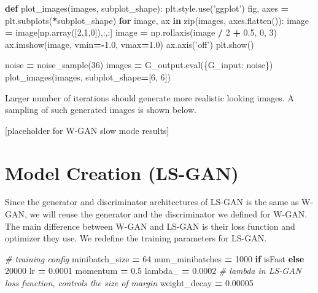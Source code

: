 \documentclass[]{book}
\newenvironment{Shaded}{\begin{snugshade}}{\end{snugshade}}
\newcommand{\KeywordTok}[1]{\textcolor[rgb]{0.13,0.29,0.53}{\textbf{#1}}}
\newcommand{\DecValTok}[1]{\textcolor[rgb]{0.00,0.00,0.81}{#1}}
\newcommand{\FloatTok}[1]{\textcolor[rgb]{0.00,0.00,0.81}{#1}}
\newcommand{\StringTok}[1]{\textcolor[rgb]{0.31,0.60,0.02}{#1}}
\newcommand{\CommentTok}[1]{\textcolor[rgb]{0.56,0.35,0.01}{\textit{#1}}}
\newcommand{\ControlFlowTok}[1]{\textcolor[rgb]{0.13,0.29,0.53}{\textbf{#1}}}
\newcommand{\OperatorTok}[1]{\textcolor[rgb]{0.81,0.36,0.00}{\textbf{#1}}}
\newcommand{\BuiltInTok}[1]{#1}
\newcommand{\NormalTok}[1]{#1}
\theoremstyle{definition}
\theoremstyle{definition}
\theoremstyle{definition}
\theoremstyle{remark}
\begin{document}
\begin{Shaded}
\begin{Highlighting}[]
\KeywordTok{def}\NormalTok{ plot_images(images, subplot_shape):}
\NormalTok{    plt.style.use(}\StringTok{'ggplot'}\NormalTok{)}
\NormalTok{    fig, axes }\OperatorTok{=}\NormalTok{ plt.subplots(}\OperatorTok{*}\NormalTok{subplot_shape)}
    \ControlFlowTok{for}\NormalTok{ image, ax }\KeywordTok{in} \BuiltInTok{zip}\NormalTok{(images, axes.flatten()):}
\NormalTok{        image }\OperatorTok{=}\NormalTok{ image[np.array([}\DecValTok{2}\NormalTok{,}\DecValTok{1}\NormalTok{,}\DecValTok{0}\NormalTok{]),:,:]}
\NormalTok{        image }\OperatorTok{=}\NormalTok{ np.rollaxis(image }\OperatorTok{/} \DecValTok{2} \OperatorTok{+} \FloatTok{0.5}\NormalTok{, }\DecValTok{0}\NormalTok{, }\DecValTok{3}\NormalTok{)}
\NormalTok{        ax.imshow(image, vmin}\OperatorTok{=-}\FloatTok{1.0}\NormalTok{, vmax}\OperatorTok{=}\FloatTok{1.0}\NormalTok{)}
\NormalTok{        ax.axis(}\StringTok{'off'}\NormalTok{)}
\NormalTok{    plt.show()}

\NormalTok{noise }\OperatorTok{=}\NormalTok{ noise_sample(}\DecValTok{36}\NormalTok{)}
\NormalTok{images }\OperatorTok{=}\NormalTok{ G_output.}\BuiltInTok{eval}\NormalTok{(\{G_input: noise\})}
\NormalTok{plot_images(images, subplot_shape}\OperatorTok{=}\NormalTok{[}\DecValTok{6}\NormalTok{, }\DecValTok{6}\NormalTok{])}
\end{Highlighting}
\end{Shaded}

Larger number of iterations should generate more realistic looking
images. A sampling of such generated images is shown below.

{[}placeholder for W-GAN slow mode results{]}

\section{Model Creation (LS-GAN)}\label{model-creation-ls-gan}

Since the generator and discriminator architectures of LS-GAN is the
same as W-GAN, we will reuse the generator and the discriminator we
defined for W-GAN. The main difference between W-GAN and LS-GAN is their
loss function and optimizer they use. We redefine the training
parameters for LS-GAN.

\begin{Shaded}
\begin{Highlighting}[]
\CommentTok{# training config}
\NormalTok{minibatch_size }\OperatorTok{=} \DecValTok{64}
\NormalTok{num_minibatches }\OperatorTok{=} \DecValTok{1000} \ControlFlowTok{if}\NormalTok{ isFast }\ControlFlowTok{else} \DecValTok{20000}
\NormalTok{lr }\OperatorTok{=} \FloatTok{0.0001}
\NormalTok{momentum }\OperatorTok{=} \FloatTok{0.5}
\NormalTok{lambda_ }\OperatorTok{=} \FloatTok{0.0002} \CommentTok{# lambda in LS-GAN loss function, controls the size of margin}
\NormalTok{weight_decay }\OperatorTok{=} \FloatTok{0.00005}
\end{Highlighting}
\end{Shaded}
\end{document}

